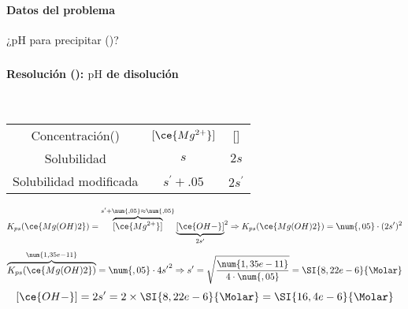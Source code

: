 
\begin{frame}
	\frametitle{\ejerciciocmd}
	\framesubtitle{Datos del problema}
	\begin{center}
		{\huge¿$\mathrm{pH}$ para precipitar ()?}\\[.3cm]
		\quad
	\end{center}
\end{frame}

\begin{frame}
	\frametitle{\ejerciciocmd}
	\framesubtitle{Resolución (): $\mathrm{pH}$ de disolución }
	 \\[.3cm]
	\begin{center}
		\begin{tabular}{ccc}
			\toprule
			Concentración(\si{\Molar}) & $[\ce{Mg^{2+}}]$ &     [\ce{OH-}]   \\
			Solubilidad                &    $s$    		  &       $2s$       \\
			Solubilidad modificada     &  $s^\prime+\num{,05}$  &       $2s^\prime$      \\
			\bottomrule
		\end{tabular}
	\end{center}
	$$
		K_{ps}(\ce{Mg(OH)2})=\overbrace{[\ce{Mg^{2+}}]}^{s^\prime+\num{,05}\approx\num{,05}}{\underbrace{[\ce{OH-}]}_{2s^\prime}}^2\Rightarrow
		K_{ps}(\ce{Mg(OH)2})=\num{,05}\cdot(2s^\prime)^2
	$$
	$$
		\overbrace{K_{ps}(\ce{Mg(OH)2})}^{\num{1,35e-11}}=\num{,05}\cdot 4{s^\prime}^2\Rightarrow
		s^\prime=\sqrt{\frac{\num{1,35e-11}}{4\cdot\num{,05}}}=\SI{8,22e-6}{\Molar}
	$$
	$$
		[\ce{OH-}]=2s^\prime=2\times\SI{8,22e-6}{\Molar}=\SI{16,4e-6}{\Molar}
	$$
	\begin{center}
	\end{center}
\end{frame}
